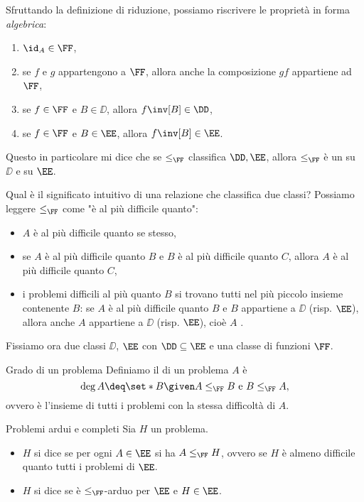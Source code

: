 \begin{remark}
    Sfruttando la definizione di riduzione, possiamo riscrivere le proprietà in forma \emph{algebrica}:
    \begin{enumerate}
        \item $\id_A \in \FF$,
        \item se $f$ e $g$ appartengono a $\FF$, allora anche la composizione $gf$ appartiene ad $\FF$,
        \item se $f \in \FF$ e $B \in \DD$, allora $f\inv[B] \in \DD$,
        \item se $f \in \FF$ e $B \in \EE$, allora $f\inv[B] \in \EE$.            
    \end{enumerate}
    Questo in particolare mi dice che se $\leq_{\FF}$ classifica $\DD, \EE$, allora $\leq_{\FF}$ è un  su $\DD$ e su $\EE$.
\end{remark}

 Qual è il significato intuitivo di una relazione che classifica due classi? Possiamo leggere $\leq_{\FF}$ come "è al più difficile quanto":
\begin{itemize}
    \item $A$ è al più difficile quanto se stesso,
    \item se $A$ è al più difficile quanto $B$ e $B$ è al più difficile quanto $C$, allora $A$ è al più difficile quanto $C$,
    \item i problemi difficili al più quanto $B$ si trovano tutti nel più piccolo insieme contenente $B$: se $A$ è al più difficile quanto $B$ e $B$ appartiene a $\DD$ (risp. $\EE$), allora anche $A$ appartiene a $\DD$ (risp. $\EE$), cioè $A$ .    
\end{itemize} 

Fissiamo ora due classi $\DD$, $\EE$ con $\DD \subseteq \EE$ e una classe di funzioni $\FF$.    

\begin{definition}
    {Grado di un problema}{}
    Definiamo il  di un problema $A$ è \[
        \deg A \deq \set*{B \given A \leq_{\FF} B \text{ e } B \leq_{\FF} A},
    \] ovvero è l'insieme di tutti i problemi con la stessa difficoltà di $A$. 
\end{definition}

\begin{definition}
    {Problemi ardui e completi}{}
    Sia $H$ un problema. \begin{itemize}
        \item $H$ si dice  se per ogni $A \in \EE$ si ha $A \leq_{\FF} H$, ovvero se $H$ è almeno difficile quanto tutti i problemi di $\EE$.
        \item $H$ si dice  se è $\leq_{\FF}$-arduo per $\EE$ e $H \in \EE$.    
    \end{itemize} 
\end{definition}

